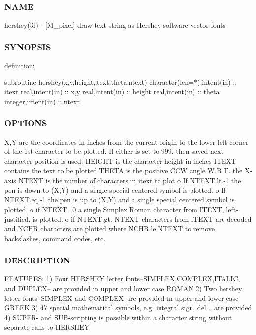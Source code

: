 \subsubsection*{N\+A\+ME}

hershey(3f) -\/ \mbox{[}M\+\_\+pixel\mbox{]} draw text string as Hershey software vector fonts 

\subsubsection*{S\+Y\+N\+O\+P\+S\+IS}

definition\+:

subroutine hershey(x,y,height,itext,theta,ntext) character(len=$\ast$),intent(in) \+:\+: itext real,intent(in) \+:\+: x,y real,intent(in) \+:\+: height real,intent(in) \+:\+: theta integer,intent(in) \+:\+: ntext

\subsubsection*{O\+P\+T\+I\+O\+NS}

X,Y are the coordinates in inches from the current origin to the lower left corner of the 1st character to be plotted. If either is set to 999. then saved next character position is used. H\+E\+I\+G\+HT is the character height in inches I\+T\+E\+XT contains the text to be plotted T\+H\+E\+TA is the positive C\+CW angle W.\+R.\+T. the X-\/axis N\+T\+E\+XT is the number of characters in itext to plot o If N\+T\+E\+X\+T.\+lt.-\/1 the pen is down to (X,Y) and a single special centered symbol is plotted. o If N\+T\+E\+X\+T.\+eq.-\/1 the pen is up to (X,Y) and a single special centered symbol is plotted. o if N\+T\+E\+XT=0 a single Simplex Roman character from I\+T\+E\+XT, left-\/justified, is plotted. o if N\+T\+E\+X\+T.\+gt. N\+T\+E\+XT characters from I\+T\+E\+XT are decoded and N\+C\+HR characters are plotted where N\+C\+H\+R.\+le.\+N\+T\+E\+XT to remove backslashes, command codes, etc. \subsubsection*{D\+E\+S\+C\+R\+I\+P\+T\+I\+ON}

F\+E\+A\+T\+U\+R\+ES\+: 1) Four H\+E\+R\+S\+H\+EY letter fonts--S\+I\+M\+P\+L\+EX,C\+O\+M\+P\+L\+EX,I\+T\+A\+L\+IC, and D\+U\+P\+L\+EX-- are provided in upper and lower case R\+O\+M\+AN 2) Two hershey letter fonts--S\+I\+M\+P\+L\+EX and C\+O\+M\+P\+L\+EX--are provided in upper and lower case G\+R\+E\+EK 3) 47 special mathematical symbols, e.\+g. integral sign, del... are provided 4) S\+U\+P\+E\+R-\/ and S\+U\+B-\/scripting is possible within a character string without separate calls to H\+E\+R\+S\+H\+EY

